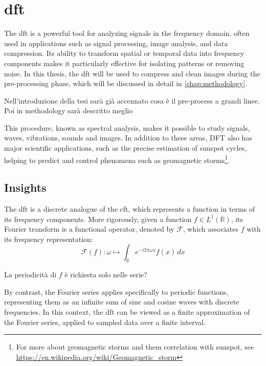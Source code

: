 \section{\gls{dft}}
\begin{modified}
The \gls{dft} is a powerful tool for analyzing signals in the frequency domain, often used in applications such as signal processing, image analysis, and data compression. Its ability to transform spatial or temporal data into frequency components makes it particularly effective for isolating patterns or removing noise. In this thesis, the \gls{dft} will be used to compress and clean images during the pre-processing phase, which will be discussed in detail in \cref{chap:methodology}.
\end{modified}
\begin{note}
	Nell'introduzione della tesi sarà già accennato cosa è il pre-process a grandi linee. Poi in methodology sarà descritto meglio
\end{note}

\noindent This procedure, known as spectral analysis, makes it possible to study signals, waves, vibrations, sounds and images. In addition to these areas, DFT also has major scientific applications, such as the precise estimation of sunspot cycles, helping to predict and control phenomena such as geomagnetic storms\footnote{For more about geomagnetic storms and them correlation with sunspot, see \url{https://en.wikipedia.org/wiki/Geomagnetic_storm}}.

\subsection{Insights}
\begin{modified}
	The \gls{dft} is a discrete analogue of the \gls{cft}, which represents a function in terms of its frequency components. More rigorously, given a function $f\in L^1(\mathbb{R})$, its Fourier transform is a functional operator, denoted by $\mathcal{F}$, which associates $f$ with its frequency representation:
	\[
		\mathcal{F}(f): \omega \mapsto \int_{\mathbb{R}} e^{-i2\pi \omega x}f(x)\,dx
	\]
	\begin{note}
		La periodicità di $f$ è richiesta solo nelle serie?
	\end{note}

	\noindent By contrast, the Fourier series applies specifically to periodic functions, representing them as an infinite sum of sine and cosine waves with discrete frequencies. In this context, the \gls{dft} can be viewed as a finite approximation of the Fourier series, applied to sampled data over a finite interval.
\end{modified}

